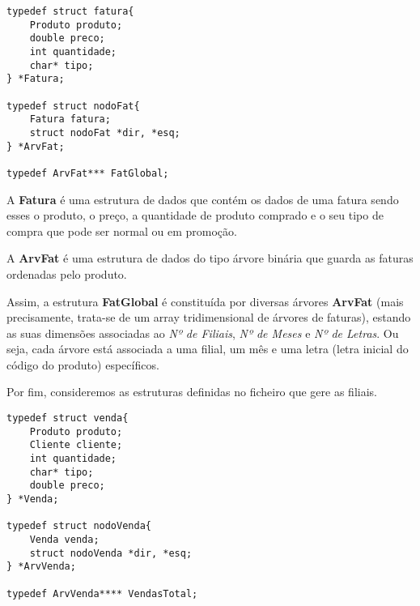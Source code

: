 \documentclass{article}
\begin{document}
\begin{lstlisting}
typedef struct fatura{
	Produto produto;
	double preco;
	int quantidade;
	char* tipo;
} *Fatura;

typedef struct nodoFat{
	Fatura fatura;
	struct nodoFat *dir, *esq;
} *ArvFat;

typedef ArvFat*** FatGlobal;
\end{lstlisting}


A \textbf{Fatura} é uma estrutura de dados que contém os dados de uma fatura sendo esses o produto, o preço, a quantidade de produto comprado e o seu tipo de compra que pode ser normal ou em promoção.

A \textbf{ArvFat} é uma estrutura de dados do tipo árvore binária que guarda as faturas ordenadas pelo produto.

Assim, a estrutura \textbf{FatGlobal} é constituída por diversas árvores \textbf{ArvFat} (mais precisamente, trata-se de um array tridimensional de árvores de faturas), estando as suas dimensões associadas ao \textit{Nº de Filiais}, \textit{Nº de Meses} e \textit{Nº de Letras}. Ou seja, cada árvore está associada a uma filial, um mês e uma letra (letra inicial do código do produto) específicos. 

Por fim, consideremos as estruturas definidas no ficheiro que gere as filiais.
\\ 

\begin{lstlisting}
typedef struct venda{
	Produto produto;
	Cliente cliente;
	int quantidade;
	char* tipo;
	double preco;
} *Venda;

typedef struct nodoVenda{
	Venda venda;
	struct nodoVenda *dir, *esq;
} *ArvVenda;

typedef ArvVenda**** VendasTotal;
\end{lstlisting}
\end{document}
